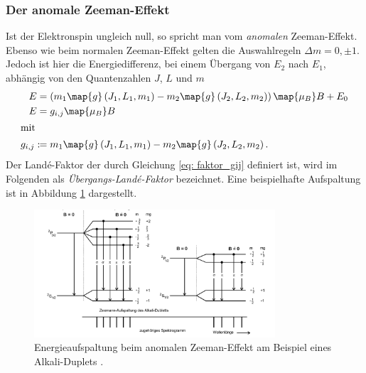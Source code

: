 \subsubsection{Der anomale Zeeman-Effekt}
Ist der Elektronspin ungleich null, so spricht man vom \emph{anomalen} Zeeman-Effekt.
Ebenso wie beim normalen Zeeman-Effekt gelten die Auswahlregeln $\Delta m=0, \pm 1$.
Jedoch ist hier die Energiedifferenz, bei einem Übergang von $E_2$ nach $E_1$,
abhängig von den Quantenzahlen $J$, $L$ und $m$
\begin{align}
  E&=\left(m_1\map{g}\left(J_1,L_1,m_1\right)-m_2\map{g}\left(J_2,L_2,m_2\right)\right)\map{\mu_B}B+E_0 \notag \\
  E&=g_{i,j}\map{\mu_B}B \label{eq:energie_anomale_zemman}\\
\shortintertext{mit}
g_{i,j}:\!\!&=m_1\map{g}\left(J_1,L_1,m_1\right)-m_2\map{g}\left(J_2,L_2,m_2\right)\label{eq: faktor_gij}.
\end{align}
Der Landé-Faktor der durch Gleichung \eqref{eq: faktor_gij} definiert ist, wird im Folgenden als \emph{Übergangs-Landé-Faktor} bezeichnet.
Eine beispielhafte Aufspaltung ist in Abbildung \ref{fig: energie_aufspaltung_annomaler} dargestellt.
\FloatBarrier
\begin{figure}[h]
  \centering
  \includegraphics[width=0.8\textwidth]{pics/energieaufspaltung_annomaler.png}
  \caption{Energieaufspaltung beim anomalen Zeeman-Effekt am Beispiel eines Alkali-Duplets \cite{anleitung27}.}
  \label{fig: energie_aufspaltung_annomaler}
\end{figure}
\FloatBarrier
